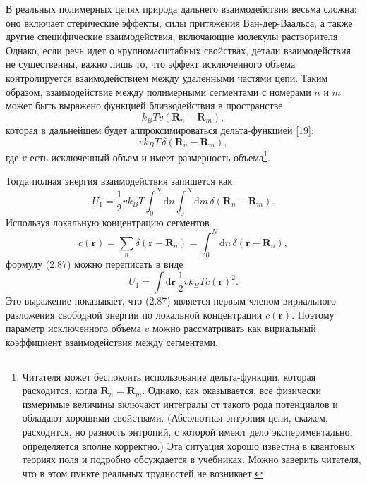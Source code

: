 \documentclass[12pt,a4paper]{article}
\begin{document}
В реальных полимерных цепях природа дальнего взаимодействия весьма сложна: оно включает стерические эффекты, силы притяжения Ван-дер-Ваальса, а также другие специфические взаимодействия, включающие молекулы растворителя. Однако, если речь идет о крупномасштабных свойствах, детали взаимодействия не существенны, важно лишь то, что эффект исключенного объема контролируется взаимодействием между удаленными частями цепи. Таким образом, взаимодействие между полимерными сегментами с номерами $n$ и $m$ может быть выражено функцией близкодействия в пространстве
\begin{equation}
k_B T \tilde{v}(\boldsymbol{R}_n - \boldsymbol{R}_m), \tag{2.85}
\end{equation}
которая в дальнейшем будет аппроксимироваться дельта-функцией [19]:
\begin{equation}
v k_B T\,\delta(\boldsymbol{R}_n - \boldsymbol{R}_m), \tag{2.86}
\end{equation}
где $v$ есть исключенный объем и имеет размерность объема\footnote{Читателя может беспокоить использование дельта-функции, которая расходится, когда $\boldsymbol{R}_n = \boldsymbol{R}_m$. Однако, как оказывается, все физически измеримые величины включают интегралы от такого рода потенциалов и обладают хорошими свойствами. (Абсолютная энтропия цепи, скажем, расходится, но разность энтропий, с которой имеют дело экспериментально, определяется вполне корректно.) Эта ситуация хорошо известна в квантовых теориях поля и подробно обсуждается в учебниках. Можно заверить читателя, что в этом пункте реальных трудностей не возникает.}.

Тогда полная энергия взаимодействия запишется как
\begin{equation}
U_1 = \frac{1}{2}v k_B T\int_0^N\!\mathrm{d}n\int_0^N\!\mathrm{d}m\,\delta(\boldsymbol{R}_n - \boldsymbol{R}_m). \tag{2.87}
\end{equation}
Используя локальную концентрацию сегментов
\begin{equation}
c(\boldsymbol{r}) = \sum_n \delta(\boldsymbol{r} - \boldsymbol{R}_n) = \int_0^N\!\mathrm{d}n\,\delta(\boldsymbol{r} - \boldsymbol{R}_n), \tag{2.88}
\end{equation}
формулу (2.87) можно переписать в виде
\begin{equation}
U_1 = \int\!\mathrm{d}\boldsymbol{r}\,\frac{1}{2}v k_B T c(\boldsymbol{r})^2. \tag{2.89}
\end{equation}
Это выражение показывает, что (2.87) является первым членом вириального разложения свободной энергии по локальной концентрации $c(\boldsymbol{r})$. Поэтому параметр исключенного объема $v$ можно рассматривать как вириальный коэффициент взаимодействия между сегментами.
\end{document}
